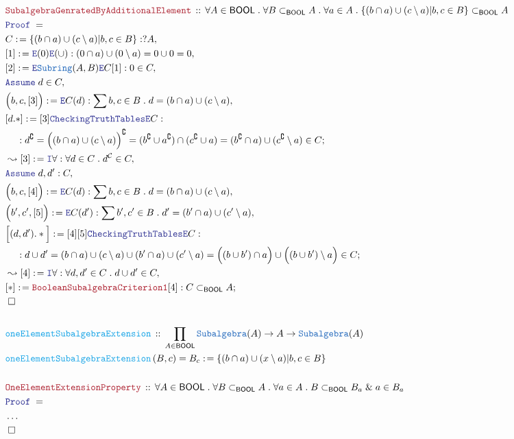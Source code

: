 \documentclass[12pt]{scrartcl}
\newcommand{\TYPE}[1]{\textcolor{NavyBlue}{\mathtt{#1}}}
\newcommand{\FUNC}[1]{\textcolor{Cerulean}{\mathtt{#1}}}
\newcommand{\LOGIC}[1]{\textcolor{Blue}{\mathtt{#1}}}
\newcommand{\THM}[1]{\textcolor{Maroon}{\mathtt{#1}}}
\renewcommand{\.}{\; . \;}
\newcommand{\de}{: \kern 0.1pc =}
\newcommand{\Act}[1]{\left( #1 \right)}
\newcommand{\Theorem}[2]{& \THM{#1} \, :: \, #2 \\ & \Proof = \\ }
\newcommand{\DeclareFunc}[2]{& \FUNC{#1} \, :: \, #2 \\}
\newcommand{\DefineNamedFunc}[4]{&  \FUNC{#1}\Act{#2} = #3 \de #4 \\}
\newcommand{\NewLine}{\\ & \kern 1pc}
\newcommand{\Page}[1]{ \begin{align*} #1 \end{align*}   }
\newcommand{\NoProof}{ & \ldots \\ \EndProof}
\renewcommand{\And}{\; \& \;}
\newcommand{\Intro}{\LOGIC{I}}
\newcommand{\Elim}{\LOGIC{E}}
\renewcommand{\c}{\complement}
\newcommand{\Say}[3]{& #1 \de #2 : #3, \\}
\newcommand{\Conclude}[3]{& #1 \de #2 : #3; \\}
\newcommand{\Derive}[3]{& \leadsto #1 \de #2 : #3, \\}
\newcommand{\Assume}[2]{& \LOGIC{Assume} \; #1 : #2, \\}
\newcommand{\AssumeIn}[2]{& \LOGIC{Assume} \; #1 \in #2, \\}
\newcommand{\QED}{\; \square}
\newcommand{\EndProof}{& \QED \\}
\newcommand{\Proof}{\LOGIC{Proof} \; }
\newcommand{\C}{\mathcal{C}}
\newcommand{\BOOL}{\mathsf{BOOL}}
\begin{document}
\Page{
	\Theorem{SubalgebraGenratedByAdditionalElement}
	{
		\forall A \in \BOOL \.
		\forall B \subset_\BOOL A \.
		\forall a \in A \.
		\{ (b \cap a) \cup (c \setminus a) | b,c \in B  \} \subset_\BOOL A
	}
	\Say{C}{\{ (b \cap a) \cup (c \setminus a) | b,c \in B  \} }{?A}
	\Say{[1]}{\Elim(0)\Elim(\cup)}
	{  
		(0 \cap a) \cup (0 \setminus a) = 0 \cup 0 = 0
	}
	\Say{[2]}{\Elim \TYPE{Subring}(A,B)\Elim C [1]}{ 0 \in C}
	\AssumeIn{d}{C}
	\Say{\Big(b,c,[3]\Big)}{\Elim C(d)}{\sum b,c \in B \. d = (b \cap a) \cup (c \setminus a)}
	\Conclude{[d.*]}{[3]\LOGIC{CheckingTruthTables}\Elim C}
	{
		\NewLine :
		d^\c  =   \Big( (b \cap a) \cup (c \setminus a) \Big)^\c  =
		(b^\c \cup a^\c) \cap  (c^\c \cup a) =
		(b^\c \cap a) \cup (c^\c \setminus a) \in C
	}
	\Derive{[3]}{\Intro \forall}{\forall d \in C \. d^\C \in C }
	\Assume{d,d'}{C}
	\Say{\Big(b,c,[4]\Big)}{\Elim C(d)}{\sum b,c \in B \. d = (b \cap a) \cup (c \setminus a)}
	\Say{\Big(b',c',[5]\Big)}{\Elim C(d')}{\sum b',c' \in B \. d' = (b' \cap a) \cup (c' \setminus a)}
	\Conclude{\Big[(d,d').*\Big]}{[4][5]\LOGIC{CheckingTruthTables}\Elim C}
	{
		\NewLine :
		d \cup d'  = 
		(b \cap a) \cup (c \setminus a) 
		\cup
		(b' \cap a) \cup (c' \setminus a) =  
		\Big( (b \cup b') \cap a \Big) \cup \Big( (b \cup b') \setminus a \Big)  
		\in C
	}
	\Derive{[4]}{\Intro \forall}{ \forall d,d' \in C \. d \cup d' \in C}
	\Conclude{[*]}{\THM{BooleanSubalgebraCriterion1}[4]}
	{
		C \subset_\BOOL A
	}
	\EndProof
	\\
	\DeclareFunc{oneElementSubalgebraExtension}
	{
		\prod_{A \in \BOOL} \TYPE{Subalgebra}(A) \to A \to \TYPE{Subalgebra}(A)
	}
	\DefineNamedFunc{oneElementSubalgebraExtension}{B,c}{B_c}
	{
		\{ (b \cap a) \cup (x \setminus a) | b,c \in B \} 
	}
	\\
	\Theorem{OneElementExtensionProperty}
	{
		\forall A \in \BOOL \.
		\forall B \subset_\BOOL A \.
		\forall a \in A \. 
		B \subset_\BOOL B_a \And a \in B_a
	}
	\NoProof
}
\end{document}
